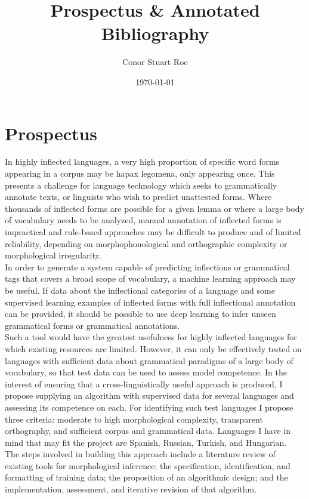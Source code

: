 \documentclass{article}
\title{Prospectus \& Annotated Bibliography}
\author{Conor Stuart Roe}
\date{\today}
\begin{document}
\thispagestyle{empty}
\maketitle

\section*{Prospectus}

In highly inflected languages, a very high proportion of specific word forms appearing in a corpus may be hapax legomena, only appearing once. This presents a challenge for language technology which seeks to grammatically annotate texts, or linguists who wish to predict unattested forms. Where thousands of inflected forms are possible for a given lemma or where a large body of vocabulary needs to be analyzed, manual annotation of inflected forms is impractical and rule-based approaches may be difficult to produce and of limited reliability, depending on morphophonological and orthographic complexity or morphological irregularity. \\

In order to generate a system capable of predicting inflections or grammatical tags that covers a broad scope of vocabulary, a machine learning approach may be useful. If data about the inflectional categories of a language and some supervised learning examples of inflected forms with full inflectional annotation can be provided, it should be possible to use deep learning to infer unseen grammatical forms or grammatical annotations. \\

Such a tool would have the greatest usefulness for highly inflected languages for which existing resources are limited. However, it can only be effectively tested on languages with sufficient data about grammatical paradigms of a large body of vocabulary, so that test data can be used to assess model competence. In the interest of ensuring that a cross-linguistically useful approach is produced, I propose supplying an algorithm with supervised data for several languages and assessing its competence on each. For identifying such test languages I propose three criteria: moderate to high morphological complexity, transparent orthography, and sufficient corpus and grammatical data. Languages I have in mind that may fit the project are Spanish, Russian, Turkish, and Hungarian. \\

The steps involved in building this approach include a literature review of existing tools for morphological inference; the specification, identification, and formatting of training data; the proposition of an algorithmic design; and the implementation, assessment, and iterative revision of that algorithm. \\
\end{document}
